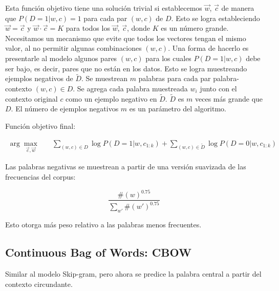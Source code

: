 Esta función objetivo tiene una solución trivial si establecemos $\vec{w}$, $\vec{c}$ de manera que $P(D=1|w,c)=1$ para cada par $(w,c)$ de $D$.
Esto se logra estableciendo $\vec{w}=\vec{c}$ y $\vec{w} \cdot \vec{c} = K$ para todos los $\vec{w}$, $\vec{c}$, donde $K$ es un número grande.
Necesitamos un mecanismo que evite que todos los vectores tengan el mismo valor, al no permitir algunas combinaciones $(w, c)$.
Una forma de hacerlo es presentarle al modelo algunos pares $(w, c)$ para los cuales $P(D=1|w, c)$ debe ser bajo, es decir, pares que no están en los datos.
Esto se logra muestreando ejemplos negativos de $\tilde{D}$.
Se muestrean $m$ palabras para cada par palabra-contexto $(w,c) \in D$.
Se agrega cada palabra muestreada $w_i$ junto con el contexto original $c$ como un ejemplo negativo en $\tilde{D}$.
$\tilde{D}$ es $m$ veces más grande que $D$.
El número de ejemplos negativos $m$ es un parámetro del algoritmo.

Función objetivo final:

\begin{equation}
\begin{split}
\operatorname{arg} \max_{\vec{c}, \vec{w}} & \quad \sum_{(w,c) \in D}{\log P(D = 1| w,c_{1:k})} + \sum_{(w,c) \in \tilde{D}} \log P(D = 0| w,c_{1:k})
\end{split}
\end{equation}

Las palabras negativas se muestrean a partir de una versión suavizada de las frecuencias del corpus:

\begin{displaymath}
\frac{\#(w)^{0.75}}{\sum_{w'}\#(w')^{0.75}}
\end{displaymath}

Esto otorga más peso relativo a las palabras menos frecuentes.

\subsection{Continuous Bag of Words: CBOW}

Similar al modelo Skip-gram, pero ahora se predice la palabra central a partir del contexto circundante.

